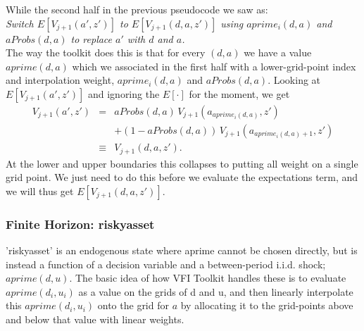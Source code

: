 While the second half in the previous pseudocode we saw as: \\
\textit{Switch $E[V_{j+1}(a',z')]$ to $E[V_{j+1}(d,a,z')]$ using $aprime_i(d,a)$ and $aProbs(d,a)$ to replace $a'$ with $d$ and $a$.}
\\ The way the toolkit does this is that for every $(d,a)$ we have a value $aprime(d,a)$ which we associated in the first half with a lower-grid-point index and interpolation weight, $aprime_i(d,a)$ and $aProbs(d,a)$. Looking at $E[V_{j+1}(a',z')]$ and ignoring the $E[\cdot]$ for the moment, we get
\begin{eqnarray*}
V_{j+1}(a',z') &=& aProbs(d,a)\,V_{j+1}(a_{aprime_i(d,a)},z') \\
&& + (1-aProbs(d,a))\,V_{j+1}(a_{aprime_i(d,a)+1},z') \\
&\equiv& V_{j+1}(d,a,z').
\end{eqnarray*}
At the lower and upper boundaries this collapses to putting all weight on a single grid point. We just need to do this before we evaluate the expectations term, and we will thus get $E[V_{j+1}(d,a,z')]$.

\subsubsection{Finite Horizon: riskyasset}
'riskyasset' is an endogenous state where aprime cannot be chosen directly, but is instead a function of a decision variable and a between-period i.i.d. shock; $aprime(d,u)$. The basic idea of how VFI Toolkit handles these is to evaluate $aprime(d_i,u_i)$ as a value on the grids of d and u, and then linearly interpolate this $aprime(d_i,u_i)$ onto the grid for $a$ by allocating it to the grid-points above and below that value with linear weights.

